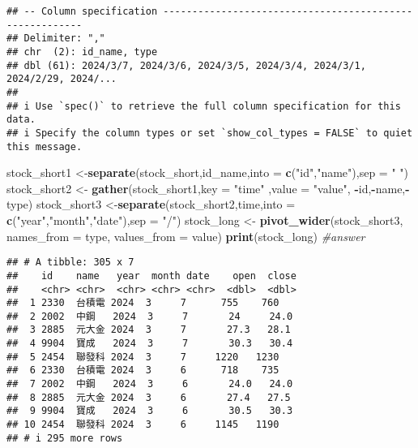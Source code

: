 \documentclass[
]{article}
\newenvironment{Shaded}{\begin{snugshade}}{\end{snugshade}}
\newcommand{\AttributeTok}[1]{\textcolor[rgb]{0.13,0.29,0.53}{#1}}
\newcommand{\CommentTok}[1]{\textcolor[rgb]{0.56,0.35,0.01}{\textit{#1}}}
\newcommand{\FunctionTok}[1]{\textcolor[rgb]{0.13,0.29,0.53}{\textbf{#1}}}
\newcommand{\NormalTok}[1]{#1}
\newcommand{\OtherTok}[1]{\textcolor[rgb]{0.56,0.35,0.01}{#1}}
\newcommand{\SpecialCharTok}[1]{\textcolor[rgb]{0.81,0.36,0.00}{\textbf{#1}}}
\newcommand{\StringTok}[1]{\textcolor[rgb]{0.31,0.60,0.02}{#1}}
\begin{document}
\begin{verbatim}
## -- Column specification --------------------------------------------------------
## Delimiter: ","
## chr  (2): id_name, type
## dbl (61): 2024/3/7, 2024/3/6, 2024/3/5, 2024/3/4, 2024/3/1, 2024/2/29, 2024/...
## 
## i Use `spec()` to retrieve the full column specification for this data.
## i Specify the column types or set `show_col_types = FALSE` to quiet this message.
\end{verbatim}

\begin{Shaded}
\begin{Highlighting}[]
\NormalTok{stock\_short1 }\OtherTok{\textless{}{-}}\FunctionTok{separate}\NormalTok{(stock\_short,id\_name,}\AttributeTok{into =} \FunctionTok{c}\NormalTok{(}\StringTok{"id"}\NormalTok{,}\StringTok{"name"}\NormalTok{),}\AttributeTok{sep =} \StringTok{" "}\NormalTok{)}
\NormalTok{stock\_short2 }\OtherTok{\textless{}{-}} \FunctionTok{gather}\NormalTok{(stock\_short1,}\AttributeTok{key =} \StringTok{"time"}\NormalTok{ ,}\AttributeTok{value =} \StringTok{"value"}\NormalTok{, }\SpecialCharTok{{-}}\NormalTok{id,}\SpecialCharTok{{-}}\NormalTok{name,}\SpecialCharTok{{-}}\NormalTok{type)}
\NormalTok{stock\_short3 }\OtherTok{\textless{}{-}}\FunctionTok{separate}\NormalTok{(stock\_short2,time,}\AttributeTok{into =} \FunctionTok{c}\NormalTok{(}\StringTok{"year"}\NormalTok{,}\StringTok{"month"}\NormalTok{,}\StringTok{"date"}\NormalTok{),}\AttributeTok{sep =} \StringTok{"/"}\NormalTok{)}
\NormalTok{stock\_long }\OtherTok{\textless{}{-}} \FunctionTok{pivot\_wider}\NormalTok{(stock\_short3, }\AttributeTok{names\_from =}\NormalTok{ type, }\AttributeTok{values\_from =}\NormalTok{ value) }
\FunctionTok{print}\NormalTok{(stock\_long) }\CommentTok{\#answer}
\end{Highlighting}
\end{Shaded}

\begin{verbatim}
## # A tibble: 305 x 7
##    id    name   year  month date    open  close
##    <chr> <chr>  <chr> <chr> <chr>  <dbl>  <dbl>
##  1 2330  台積電 2024  3     7      755    760  
##  2 2002  中鋼   2024  3     7       24     24.0
##  3 2885  元大金 2024  3     7       27.3   28.1
##  4 9904  寶成   2024  3     7       30.3   30.4
##  5 2454  聯發科 2024  3     7     1220   1230  
##  6 2330  台積電 2024  3     6      718    735  
##  7 2002  中鋼   2024  3     6       24.0   24.0
##  8 2885  元大金 2024  3     6       27.4   27.5
##  9 9904  寶成   2024  3     6       30.5   30.3
## 10 2454  聯發科 2024  3     6     1145   1190  
## # i 295 more rows
\end{verbatim}
\end{document}
